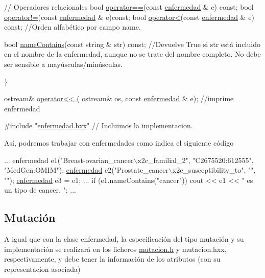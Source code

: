 \begin{DoxyCode}
\textcolor{comment}{// Operadores relacionales}
 \textcolor{keywordtype}{bool} \hyperlink{classenfermedad_ac2786ad7be914729516dd15611532fbb}{operator==}(\textcolor{keyword}{const} \hyperlink{classenfermedad}{enfermedad} & e) \textcolor{keyword}{const}; 
 \textcolor{keywordtype}{bool} \hyperlink{classenfermedad_a85bf5cbb035fd4712ff9a72188060e5c}{operator!=}(\textcolor{keyword}{const} \hyperlink{classenfermedad}{enfermedad} & e)\textcolor{keyword}{const};
 \textcolor{keywordtype}{bool} \hyperlink{classenfermedad_a2b3361849fa17dc88be561cd4233d584}{operator<}(\textcolor{keyword}{const} \hyperlink{classenfermedad}{enfermedad} & e) \textcolor{keyword}{const};  \textcolor{comment}{//Orden alfabético por campo name. }

 \textcolor{keywordtype}{bool} \hyperlink{classenfermedad_a31f2b1bed5745d9f00f3e567c04e68af}{nameContains}(\textcolor{keyword}{const} \textcolor{keywordtype}{string} & str) \textcolor{keyword}{const};   \textcolor{comment}{//Devuelve True si str está incluido en el
       nombre de la enfermedad, aunque no se trate del nombre completo. No debe ser sensible a mayúsculas/minúsculas. }

\}

 ostream& \hyperlink{enfermedad_8h_a6cabaa51c1fab8960486e2c2e51071f0}{operator<< }( ostream& os, \textcolor{keyword}{const} \hyperlink{classenfermedad}{enfermedad} & e); \textcolor{comment}{//imprime enfermedad }

\textcolor{preprocessor}{#include "\hyperlink{enfermedad_8hxx}{enfermedad.hxx}"} \textcolor{comment}{// Incluimos la implementacion.}
\end{DoxyCode}


Así, podremos trabajar con enfermedades como indica el siguiente código 
\begin{DoxyCode}
...
enfermedad e1(\textcolor{stringliteral}{"Breast-ovarian\_cancer\(\backslash\)x2c\_familial\_2"}, \textcolor{stringliteral}{"C2675520:612555"}, \textcolor{stringliteral}{"MedGen:OMIM"});
\hyperlink{classenfermedad}{enfermedad} e2(\textcolor{stringliteral}{"Prostate\_cancer\(\backslash\)x2c\_susceptibility\_to"}, \textcolor{stringliteral}{""}, \textcolor{stringliteral}{""});
\hyperlink{classenfermedad}{enfermedad} e3 = e1; 
...
if (e1.nameContains(\textcolor{stringliteral}{"cancer"})) 
  cout << e1 << \textcolor{stringliteral}{" es un tipo de cancer. "}; 
...
\end{DoxyCode}
\hypertarget{index_mutation}{}\subsection{Mutación}\label{index_mutation}
A igual que con la clase enfermedad, la especificación del tipo mutación y su implementación se realizará en los ficheros \hyperlink{mutacion_8h}{mutacion.\-h} y mutacion.\-hxx, respectivamente, y debe tener la información de los atributos (con su representacion asociada)

